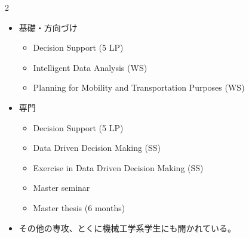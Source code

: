 \clearpage
{}
\begin{multicols}{2}\scriptsize\raggedcolumns
{}
\begin{itemize}
\item 基礎・方向づけ
\begin{itemize}
\item Decision Support (5 LP)
\item Intelligent Data Analysis (WS)
\item Planning for Mobility and Transportation Purposes (WS)
\end{itemize}
\item 専門
\begin{itemize}
\item Decision Support (5 LP)
\item Data Driven Decision Making (SS)
\item Exercise in Data Driven Decision Making (SS)
\item Master seminar
\item Master thesis (6 months)
\end{itemize}
\item その他の専攻、とくに機械工学系学生にも開かれている。
\end{itemize}
\end{multicols}

